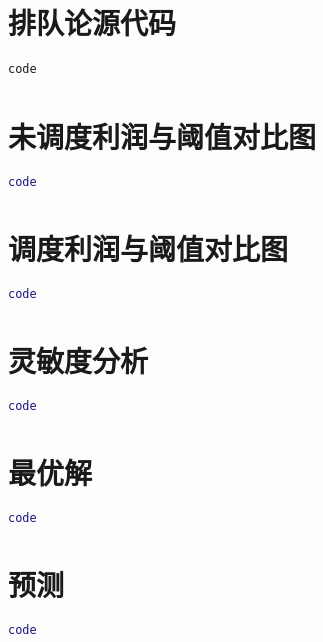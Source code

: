 \documentclass[withoutpreface,bwprint]{cumcmthesis} %
\begin{document}
    \newpage
    \appendix
    \section{排队论源代码}
    \begin{lstlisting}[language=lingo]
        code
\end{lstlisting}
\section{未调度利润与阈值对比图}
\begin{lstlisting}[language=matlab]
    code
\end{lstlisting}
\section{调度利润与阈值对比图}
\begin{lstlisting}[language=matlab]
    code
\end{lstlisting}
\section{灵敏度分析}
\begin{lstlisting}[language=matlab]
    code
\end{lstlisting}
\section{最优解}
\begin{lstlisting}[language=matlab]
    code
\end{lstlisting}
\section{预测}
\begin{lstlisting}[language=matlab]
    code
\end{lstlisting}
\end{document}
